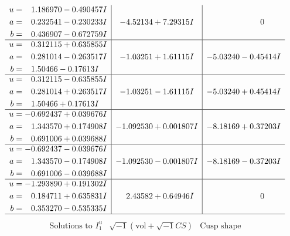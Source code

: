 \documentclass[1p]{elsarticle_modified}
\theoremstyle{definition}
\newcommand{\I}{\sqrt{-1}}
\begin{document}
$$\begin{array}{c|c|c}
\begin{aligned}
u &= \phantom{-}1.186970 - 0.490457 I \\
a &= \phantom{-}0.232541 - 0.230233 I \\
b &= \phantom{-}0.436907 - 0.672759 I\end{aligned}
 & -4.52134 + 7.29315 I & \phantom{-0.000000 } 0 \\ \hline\begin{aligned}
u &= \phantom{-}0.312115 + 0.635855 I \\
a &= \phantom{-}0.281014 - 0.263517 I \\
b &= \phantom{-}1.50466 - 0.17613 I\end{aligned}
 & -1.03251 + 1.61115 I & -5.03240 - 0.45414 I \\ \hline\begin{aligned}
u &= \phantom{-}0.312115 - 0.635855 I \\
a &= \phantom{-}0.281014 + 0.263517 I \\
b &= \phantom{-}1.50466 + 0.17613 I\end{aligned}
 & -1.03251 - 1.61115 I & -5.03240 + 0.45414 I \\ \hline\begin{aligned}
u &= -0.692437 + 0.039676 I \\
a &= \phantom{-}1.343570 + 0.174908 I \\
b &= \phantom{-}0.691006 + 0.039688 I\end{aligned}
 & -1.092530 + 0.001807 I & -8.18169 + 0.37203 I \\ \hline\begin{aligned}
u &= -0.692437 - 0.039676 I \\
a &= \phantom{-}1.343570 - 0.174908 I \\
b &= \phantom{-}0.691006 - 0.039688 I\end{aligned}
 & -1.092530 - 0.001807 I & -8.18169 - 0.37203 I \\ \hline\begin{aligned}
u &= -1.293890 + 0.191302 I \\
a &= \phantom{-}0.184711 + 0.635831 I \\
b &= \phantom{-}0.353270 - 0.535335 I\end{aligned}
 & \phantom{-}2.43582 + 0.64946 I & \phantom{-0.000000 } 0\\
 \hline 
 \end{array}$$\newpage$$\begin{array}{c|c|c}  
\text{Solutions to }I^u_{1}& \I (\text{vol} + \sqrt{-1}CS) & \text{Cusp shape}\\

\end{array}$$
\end{document}
